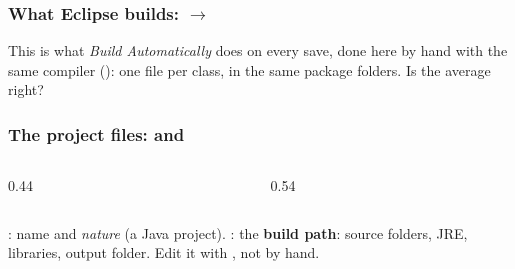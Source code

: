 \documentclass[aspectratio=169,10pt,compress]{beamer}
\begin{document}
\begin{frame}[t,fragile] \frametitle{What Eclipse builds:  $\to$ }

  \vspace{0.1em}
  \small
  This is what \emph{Build Automatically} does on every save, done here by hand with the same compiler ():
  one  file per class, in the same package folders. Is the average right?
\end{frame}




\begin{frame}[t,fragile] \frametitle{The project files:  and }
  \begin{columns}[T]
    \begin{column}{0.44\textwidth}
    \end{column}
    \begin{column}{0.54\textwidth}
    \end{column}
  \end{columns}
  \small {}: name and \emph{nature} (a Java project). : the \textbf{build path}: source folders,
  JRE, libraries, output folder. Edit it with , not by hand.
\end{frame}
\end{document}
